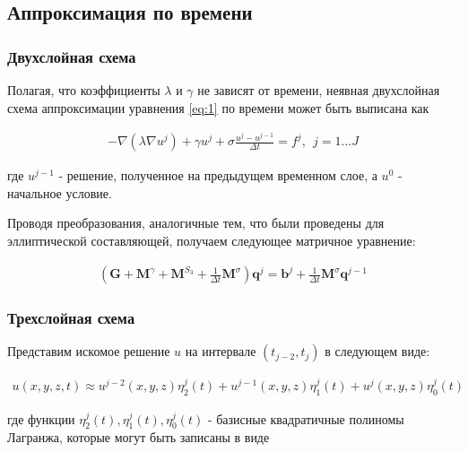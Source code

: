 \documentclass[12pt]{article}
\begin{document}
\vskip 5mm

\subsection{Аппроксимация по времени}

\subsubsection{Двухслойная схема}

\noindent Полагая, что коэффициенты $\lambda$ и $\gamma$ не зависят от времени, неявная 
  двухслойная схема аппроксимации уравнения \ref{eq:1} по времени может быть выписана как

\begin{align}
  -\nabla(\lambda \nabla u^j) + \gamma u^j + 
    \sigma\frac{u^j - u^{j-1}}{\Delta t} = f^j, \ \ j = 1...J
\end{align}

\vspace{5mm}
\noindent где $u^{j-1}$ - решение, полученное на предыдущем временном слое, а $u^0$ - начальное условие.

\vspace{2mm}
\noindent Проводя преобразования, аналогичные тем, что были проведены для эллиптической составляющей, 
  получаем следующее матричное уравнение:

\begin{align}
  (\textbf{G} + \textbf{M}^{\gamma} + \textbf{M}^{S_3} + \frac{1}{\Delta t}\textbf{M}^{\sigma})\textbf{q}^j =
    \textbf{b}^j + \frac{1}{\Delta t}\textbf{M}^{\sigma}\textbf{q}^{j-1}
\end{align}

\vspace{3mm}

\subsubsection{Трехслойная схема}

\noindent Представим искомое решение $u$ на интервале $(t_{j-2}, t_j)$ в следующем виде:

\begin{align}
  \label{eq:4} u(x, y, z, t) \approx u^{j-2}(x, y, z)\eta^j_2(t) + 
                        u^{j-1}(x, y, z)\eta^j_1(t) +
                        u^{j}(x, y, z)\eta^j_0(t)
\end{align}

\vspace{5mm}
\noindent где функции $\eta^j_2(t), \eta^j_1(t), \eta^j_0(t)$ - базисные квадратичные полиномы
  Лагранжа, которые могут быть записаны в виде
\end{document}
